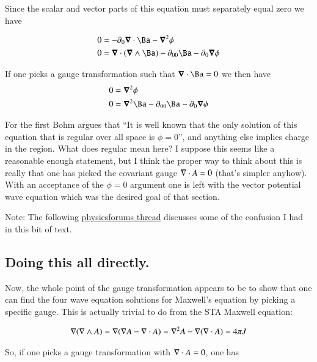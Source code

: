 Since the scalar and vector parts of this equation must separately equal zero we have

\begin{align*}
0 &= - \partial_0 \spacegrad \cdot {\Ba} - \spacegrad^2 \phi \\
0 &= \spacegrad \cdot (\spacegrad \wedge \Ba) - \partial_{00}{\Ba} - \partial_0 \spacegrad \phi  \\
\end{align*}

If one picks a gauge transformation such that $\spacegrad \cdot \Ba = 0$ we then have
\begin{align*}
0 &= \spacegrad^2 \phi \\
0 &= \spacegrad^2 \Ba - \partial_{00}{\Ba} - \partial_0 \spacegrad \phi  \\
\end{align*}

For the first Bohm argues that ``It is well known that the only solution of this equation that is regular over all space is $\phi = 0$'', and anything else implies charge in the region.  What does regular mean here?  I suppose this seems like a reasonable enough statement, but I think the proper way to think about this is really that one has picked the covariant gauge $\nabla \cdot A = 0$ (that's simpler anyhow).  With an acceptance of the $\phi =0$ argument one is left with the vector potential wave equation which was the desired goal of that section.

Note: The following \href{http://www.physicsforums.com/showthread.php?t=281874}{physicsforums thread} discusses some of the confusion I had in this bit of text.

\subsection{Doing this all directly. }

Now, the whole point of the gauge transformation appears to be to show that one can find the four wave equation solutions for 
Maxwell's equation by picking a specific gauge.  This is actually trivial to do from the STA Maxwell equation:

\begin{align*}
\nabla (\nabla \wedge A) = \nabla( \nabla A - \nabla \cdot A ) = \nabla^2 A - \nabla (\nabla \cdot A) = 4 \pi J
\end{align*}

So, if one picks a gauge transformation with $\nabla \cdot A = 0$, one has

